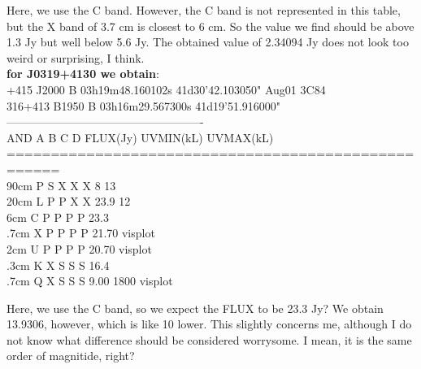 \documentclass[12pt, a4paper]{article}
\begin{document}
Here, we use the C band. However, the C band is not represented in this table, but the X band of 3.7 cm is closest to 6 cm. So the value we find should be above 1.3 Jy but well below 5.6 Jy. The obtained value of 2.34094 Jy does not look too weird or surprising, I think. \\

\noindent \textbf{for J0319+4130 we obtain}:\\
{\tiny {}+415   J2000  B 03h19m48.160102s  41d30'42.103050"  Aug01  3C84 \\
316+413   B1950  B 03h16m29.567300s  41d19'51.916000" \\
---------------------------------------------------- \\
AND        A B C D    FLUX(Jy)    UVMIN(kL)  UVMAX(kL) \\
==================================================== \\
90cm    P  S X X X          8           13 \\
20cm    L  P P X X      23.9            12 \\
 6cm    C  P P P P      23.3 \\
.7cm    X  P P P P      21.70                       visplot \\
 2cm    U  P P P P      20.70                       visplot \\
.3cm    K  X S S S      16.4  \\
.7cm    Q  X S S S       9.00                      1800   visplot \\}

Here, we use the C band, so we expect the FLUX to be 23.3 Jy? We obtain 13.9306, however, which is like 10 lower. This slightly concerns me, although I do not know what difference should be considered worrysome. I mean, it is the same order of magnitide, right? \\
\end{document}
